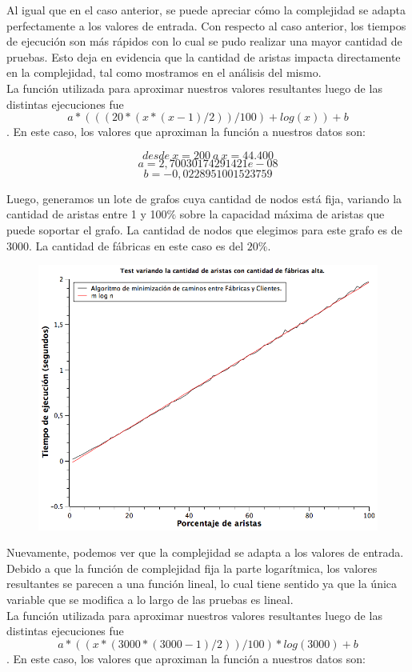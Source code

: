 Al igual que en el caso anterior, se puede apreciar cómo la complejidad se adapta perfectamente a los valores de entrada. Con respecto al caso anterior, los tiempos de ejecución son más rápidos con lo cual se pudo realizar una mayor cantidad de pruebas. Esto deja en evidencia que la cantidad de aristas impacta directamente en la complejidad, tal como mostramos en el análisis del mismo.\\
La función utilizada para aproximar nuestros valores resultantes luego de las distintas ejecuciones fue $$ a*(((20*(x*(x-1)/2)) / 100) + log(x)) + b $$.
En este caso, los valores que aproximan la función a nuestros datos son:

$$desde\ x = 200\ a\ x = 44.400 $$
$$a  = 2,70030174291421e-08$$
$$b  = -0,0228951001523759 $$


\newpage
Luego, generamos un lote de grafos cuya cantidad de nodos está fija, variando la cantidad de aristas entre 1 y 100$\%$ sobre la capacidad máxima de aristas que puede soportar el grafo. La cantidad de nodos que elegimos para este grafo es de $3000$. La cantidad de fábricas en este caso es del $20\%$.

\begin{figure}[H]
\begin{center}
	\includegraphics[width=350pt]{../tests/ej3/EJ3-r-var-denso.png}
\end{center}
\end{figure}

Nuevamente, podemos ver que la complejidad se adapta a los valores de entrada. Debido a que la función de complejidad fija la parte logarítmica, los valores resultantes se parecen a una función lineal, lo cual tiene sentido ya que la única variable que se modifica a lo largo de las pruebas es lineal.\\
La función utilizada para aproximar nuestros valores resultantes luego de las distintas ejecuciones fue $$a*((x*(3000*(3000-1)/2))/100)*log(3000)+b $$.
En este caso, los valores que aproximan la función a nuestros datos son:

